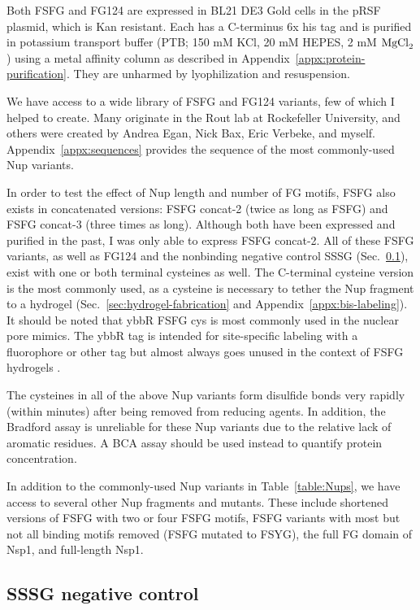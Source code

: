 Both FSFG and FG124 are expressed in BL21 DE3 Gold cells in the pRSF plasmid, which is Kan resistant.  Each has a C-terminus 6x his tag and is purified in potassium transport buffer (PTB; 150 mM KCl, 20 mM HEPES, 2 mM $\mathrm{MgCl}_2$) using a metal affinity column as described in Appendix~\ref{appx:protein-purification}.  They are unharmed by lyophilization and resuspension.

We have access to a wide library of FSFG and FG124 variants, few of which I helped to create. Many originate in the Rout lab at Rockefeller University, and others were created by Andrea Egan, Nick Bax, Eric Verbeke, and myself. Appendix~\ref{appx:sequences} provides the sequence of the most commonly-used Nup variants.

In order to test the effect of Nup length and number of FG motifs, FSFG also exists in concatenated versions: FSFG concat-2 (twice as long as FSFG) and FSFG concat-3 (three times as long).  Although both have been expressed and purified in the past, I was only able to express FSFG concat-2.  All of these FSFG variants, as well as FG124 and the nonbinding negative control SSSG (Sec.~\ref{sec:SSSG}), exist with one or both terminal cysteines as well.  The C-terminal cysteine version is the most commonly used, as a cysteine is necessary to tether the Nup fragment to a hydrogel (Sec.~\ref{sec:hydrogel-fabrication} and Appendix~\ref{appx:bis-labeling}).  It should be noted that ybbR FSFG cys is most commonly used in the nuclear pore mimics.  The ybbR tag is intended for site-specific labeling with a fluorophore or other tag but almost always goes unused in the context of FSFG hydrogels \cite{yin05}.

The cysteines in all of the above Nup variants form disulfide bonds very rapidly (within minutes) after being removed from reducing agents.  In addition, the Bradford assay is unreliable for these Nup variants due to the relative lack of aromatic residues.  A BCA assay should be used instead to quantify protein concentration.

In addition to the commonly-used Nup variants in Table~\ref{table:Nups}, we have access to several other Nup fragments and mutants.  These include shortened versions of FSFG with two or four FSFG motifs, FSFG variants with most but not all binding motifs removed (FSFG mutated to FSYG), the full FG domain of Nsp1, and full-length Nsp1.

\subsection{SSSG negative control}
\label{sec:SSSG}

